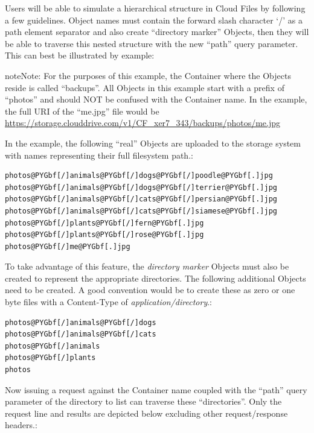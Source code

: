 \documentclass[letterpaper,10pt,english]{manual}
\begin{document}
Users will be able to simulate a hierarchical structure in Cloud Files
by following a few guidelines.  Object names must contain the forward
slash character ‘/’ as a path element separator and also create
“directory marker” Objects, then they will be able to traverse this nested
structure with the new “path” query parameter.  This can best be
illustrated by example:

\begin{notice}{note}{Note:}
For the purposes of this example, the Container where the Objects
reside is called “backups”.  All Objects in this example start with
a prefix of “photos” and should NOT be confused with the Container
name.  In the example, the full URI of the ``me.jpg'' file would be
\href{https://storage.clouddrive.com/v1/CF\_xer7\_343/backups/photos/me.jpg}{https://storage.clouddrive.com/v1/CF\_xer7\_343/backups/photos/me.jpg}
\end{notice}

In the example, the following “real” Objects are uploaded to the storage
system with names representing their full filesystem path.:

\begin{Verbatim}[commandchars=@\[\]]
photos@PYGbf[/]animals@PYGbf[/]dogs@PYGbf[/]poodle@PYGbf[.]jpg
photos@PYGbf[/]animals@PYGbf[/]dogs@PYGbf[/]terrier@PYGbf[.]jpg
photos@PYGbf[/]animals@PYGbf[/]cats@PYGbf[/]persian@PYGbf[.]jpg
photos@PYGbf[/]animals@PYGbf[/]cats@PYGbf[/]siamese@PYGbf[.]jpg
photos@PYGbf[/]plants@PYGbf[/]fern@PYGbf[.]jpg
photos@PYGbf[/]plants@PYGbf[/]rose@PYGbf[.]jpg
photos@PYGbf[/]me@PYGbf[.]jpg
\end{Verbatim}

To take advantage of this feature, the \emph{directory marker} Objects must
also be created to represent the appropriate directories.  The following
additional Objects need to be created.  A good convention would be to
create these as zero or one byte files with a Content-Type of
\emph{application/directory}.:

\begin{Verbatim}[commandchars=@\[\]]
photos@PYGbf[/]animals@PYGbf[/]dogs
photos@PYGbf[/]animals@PYGbf[/]cats
photos@PYGbf[/]animals
photos@PYGbf[/]plants
photos
\end{Verbatim}

Now issuing a  request against the Container name coupled with the
“path” query parameter of the directory to list can traverse these
“directories”.  Only the request line and results are depicted below
excluding other request/response headers.:
\end{document}
